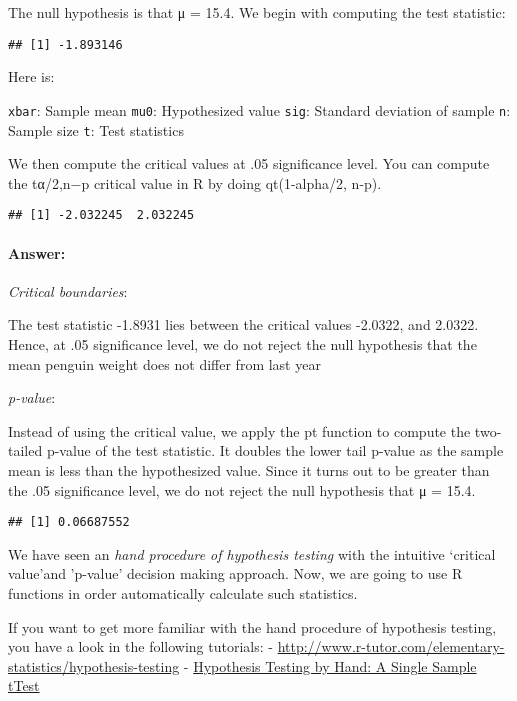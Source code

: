 \documentclass[
]{article}
\begin{document}
The null hypothesis is that μ = 15.4. We begin with computing the test
statistic:

\begin{verbatim}
## [1] -1.893146
\end{verbatim}

Here is:

\texttt{xbar}: Sample mean \texttt{mu0}: Hypothesized value
\texttt{sig}: Standard deviation of sample \texttt{n}: Sample size
\texttt{t}: Test statistics

We then compute the critical values at .05 significance level. You can
compute the tα/2,n−p critical value in R by doing qt(1-alpha/2, n-p).

\begin{verbatim}
## [1] -2.032245  2.032245
\end{verbatim}

\hypertarget{answer}{%
\paragraph{Answer:}\label{answer}}

\emph{Critical boundaries}:

The test statistic -1.8931 lies between the critical values -2.0322, and
2.0322. Hence, at .05 significance level, we do not reject the null
hypothesis that the mean penguin weight does not differ from last year

\emph{p-value}:

Instead of using the critical value, we apply the pt function to compute
the two-tailed p-value of the test statistic. It doubles the lower tail
p-value as the sample mean is less than the hypothesized value. Since it
turns out to be greater than the .05 significance level, we do not
reject the null hypothesis that μ = 15.4.

\begin{verbatim}
## [1] 0.06687552
\end{verbatim}

We have seen an \emph{hand procedure of hypothesis testing} with the
intuitive `critical value'and 'p-value' decision making approach. Now,
we are going to use R functions in order automatically calculate such
statistics.

If you want to get more familiar with the hand procedure of hypothesis
testing, you have a look in the following tutorials: -
\url{http://www.r-tutor.com/elementary-statistics/hypothesis-testing} -
\href{\%5Bhttps://www.youtube.com/watch?v=yvHQEJnYZBY\%5D}{Hypothesis
Testing by Hand: A Single Sample tTest}
\end{document}
